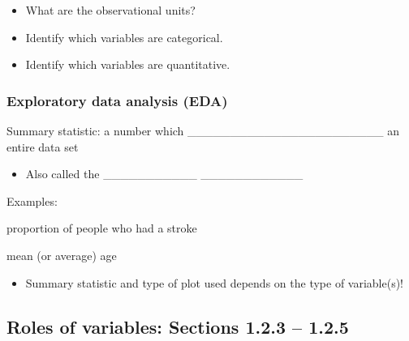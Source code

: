 \documentclass[
]{report}
\providecommand{\tightlist}{%
  \setlength{\itemsep}{0pt}\setlength{\parskip}{0pt}}
\newcommand{\rgi}{\hspace{24pt}}  %
\begin{document}
\begin{itemize}
\tightlist
\item
  What are the observational units?
\end{itemize}

\vspace{0.2in}

\begin{itemize}
\tightlist
\item
  Identify which variables are categorical.
\end{itemize}

\vspace{0.2in}

\begin{itemize}
\tightlist
\item
  Identify which variables are quantitative.
\end{itemize}

\vspace{0.2in}

\hypertarget{exploratory-data-analysis-eda}{%
\subsubsection*{Exploratory data analysis (EDA)}\label{exploratory-data-analysis-eda}}

Summary statistic: a number which \_\_\_\_\_\_\_\_\_\_\_\_\_\_\_\_\_\_\_\_\_\_\_ an entire data set

\begin{itemize}
\tightlist
\item
  Also called the \_\_\_\_\_\_\_\_\_\_\_ \_\_\_\_\_\_\_\_\_\_\_\_
\end{itemize}

\rgi Examples:

\rgi \rgi proportion of people who had a stroke

\vspace{0.3in}

\rgi \rgi mean (or average) age

\vspace{0.3in}

\begin{itemize}
\tightlist
\item
  Summary statistic and type of plot used depends on the type of variable(s)!
\end{itemize}

\hypertarget{roles-of-variables-sections-1.2.3-1.2.5}{%
\subsection*{Roles of variables: Sections 1.2.3 -- 1.2.5}\label{roles-of-variables-sections-1.2.3-1.2.5}}
\end{document}
